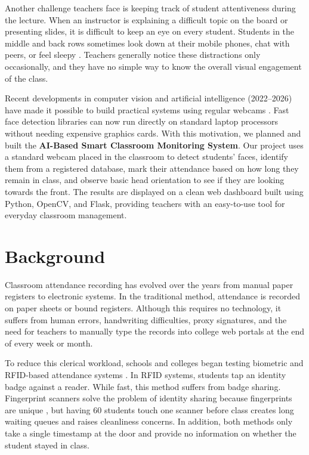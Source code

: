 \documentclass[10pt]{report}
\begin{document}
\hspace{0.5cm}Another challenge teachers face is keeping track of student attentiveness during the lecture. When an instructor is explaining a difficult topic on the board or presenting slides, it is difficult to keep an eye on every student. Students in the middle and back rows sometimes look down at their mobile phones, chat with peers, or feel sleepy \cite{booth2023engagement}. Teachers generally notice these distractions only occasionally, and they have no simple way to know the overall visual engagement of the class.

\hspace{0.5cm}Recent developments in computer vision and artificial intelligence (2022--2026) have made it possible to build practical systems using regular webcams \cite{zhang2023realtime, george2024edgeface}. Fast face detection libraries can now run directly on standard laptop processors without needing expensive graphics cards. With this motivation, we planned and built the \textbf{AI-Based Smart Classroom Monitoring System}. Our project uses a standard webcam placed in the classroom to detect students' faces, identify them from a registered database, mark their attendance based on how long they remain in class, and observe basic head orientation to see if they are looking towards the front. The results are displayed on a clean web dashboard built using Python, OpenCV, and Flask, providing teachers with an easy-to-use tool for everyday classroom management.

\section{Background}
\hspace{0.5cm}Classroom attendance recording has evolved over the years from manual paper registers to electronic systems. In the traditional method, attendance is recorded on paper sheets or bound registers. Although this requires no technology, it suffers from human errors, handwriting difficulties, proxy signatures, and the need for teachers to manually type the records into college web portals at the end of every week or month.

\hspace{0.5cm}To reduce this clerical workload, schools and colleges began testing biometric and RFID-based attendance systems \cite{rajesh2023smart}. In RFID systems, students tap an identity badge against a reader. While fast, this method suffers from badge sharing. Fingerprint scanners solve the problem of identity sharing because fingerprints are unique \cite{george2024edgeface}, but having 60 students touch one scanner before class creates long waiting queues and raises cleanliness concerns. In addition, both methods only take a single timestamp at the door and provide no information on whether the student stayed in class.
\end{document}
